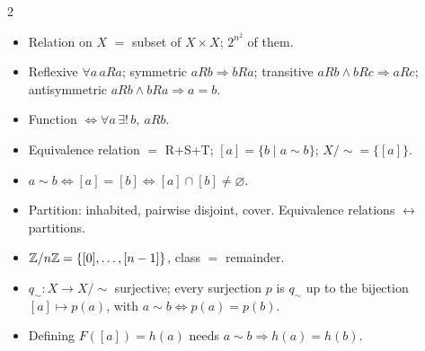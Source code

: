 \begin{multicols}{2}\small
\begin{itemize}
\item Relation on $X$ $=$ subset of $X\times X$; $2^{n^2}$ of them.
\item Reflexive $\forall a\,aRa$; symmetric $aRb\Rightarrow bRa$; transitive $aRb\wedge bRc\Rightarrow aRc$; antisymmetric $aRb\wedge bRa\Rightarrow a=b$.
\item Function $\Leftrightarrow\forall a\,\exists!\,b,\ aRb$.
\item Equivalence relation $=$ R+S+T; $[a]=\{b\mid a\sim b\}$; $X/{\sim}=\{[a]\}$.
\item $a\sim b\Leftrightarrow[a]=[b]\Leftrightarrow[a]\cap[b]\neq\varnothing$.
\item Partition: inhabited, pairwise disjoint, cover. Equivalence relations $\leftrightarrow$ partitions.
\item $\mathbb{Z}/n\mathbb{Z}=\{[0],\dots,[n-1]\}$, class $=$ remainder.
\item $q_\sim:X\to X/{\sim}$ surjective; every surjection $p$ is $q_\sim$ up to the bijection $[a]\mapsto p(a)$, with $a\sim b\Leftrightarrow p(a)=p(b)$.
\item Defining $F([a])=h(a)$ needs $a\sim b\Rightarrow h(a)=h(b)$.
\end{itemize}
\end{multicols}
